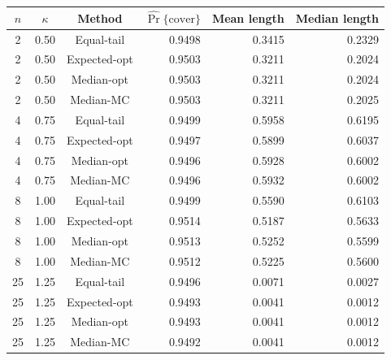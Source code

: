 \begin{tabular}{cccrrr}
\toprule
$n$ & $\kappa$ & Method & $\widehat{\Pr}\{\text{cover}\}$ & Mean length & Median length \\
\midrule
2 & 0.50 & Equal-tail & 0.9498 & 0.3415 & 0.2329 \\
2 & 0.50 & Expected-opt & 0.9503 & 0.3211 & 0.2024 \\
2 & 0.50 & Median-opt & 0.9503 & 0.3211 & 0.2024 \\
2 & 0.50 & Median-MC & 0.9503 & 0.3211 & 0.2025 \\
\midrule
4 & 0.75 & Equal-tail & 0.9499 & 0.5958 & 0.6195 \\
4 & 0.75 & Expected-opt & 0.9497 & 0.5899 & 0.6037 \\
4 & 0.75 & Median-opt & 0.9496 & 0.5928 & 0.6002 \\
4 & 0.75 & Median-MC & 0.9496 & 0.5932 & 0.6002 \\
\midrule
8 & 1.00 & Equal-tail & 0.9499 & 0.5590 & 0.6103 \\
8 & 1.00 & Expected-opt & 0.9514 & 0.5187 & 0.5633 \\
8 & 1.00 & Median-opt & 0.9513 & 0.5252 & 0.5599 \\
8 & 1.00 & Median-MC & 0.9512 & 0.5225 & 0.5600 \\
\midrule
25 & 1.25 & Equal-tail & 0.9496 & 0.0071 & 0.0027 \\
25 & 1.25 & Expected-opt & 0.9493 & 0.0041 & 0.0012 \\
25 & 1.25 & Median-opt & 0.9493 & 0.0041 & 0.0012 \\
25 & 1.25 & Median-MC & 0.9492 & 0.0041 & 0.0012 \\
\bottomrule
\end{tabular}

